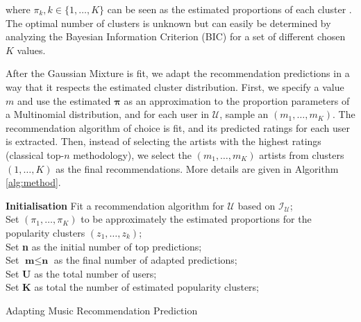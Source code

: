 \documentclass{article}
\begin{document}
where $\pi_k, k \in \{1,\dots,K\}$ can be seen as
the estimated proportions of each  cluster
\cite{murphy2012machine}. The optimal number of clusters
is unknown but can easily be determined by analyzing 
the Bayesian Information Criterion (BIC) for a set of
different chosen $K$ values.

After the Gaussian Mixture is fit, we adapt 
the recommendation predictions in a way that it
respects the estimated cluster distribution. First, 
we specify a value $m$ and use the estimated $\boldsymbol{\pi}$
as an approximation to the proportion 
parameters of a Multinomial distribution, and for each user in $\mathcal{U}$, sample 
an $(m_1,\dots, m_{K})$. The recommendation algorithm
of choice is fit, and its predicted ratings for each 
user is extracted. Then,  
instead of selecting the artists with the highest ratings
(classical top-$n$ methodology), 
we select the $(m_1,\dots, m_{K})$ artists
from clusters $(1, \dots, K)$ as the final recommendations. 
More details are given in Algorithm \ref{alg:method}. 



\begin{algorithm}[ht]
\label{alg:method}
  \textbf{Initialisation\;}
  Fit a recommendation algorithm for $\mathcal{U}$ based on $\mathcal{I}_{\mathcal{U}}$; \\
  Set $(\pi_1,\dots, \pi_{K})$ to be approximately 
  the estimated proportions 
  for the popularity clusters $(z_1,\dots,z_k)$; \\
  Set \textbf{n} as the initial number of top predictions; \\
  Set $\textbf{m} \leq \textbf{n}$ as the final number of adapted predictions; \\
  Set \textbf{U} as the total number of users; \\
  Set \textbf{K} as total the number of estimated popularity clusters;
  
 \caption{Adapting Music Recommendation Prediction}
\end{algorithm}
\end{document}
